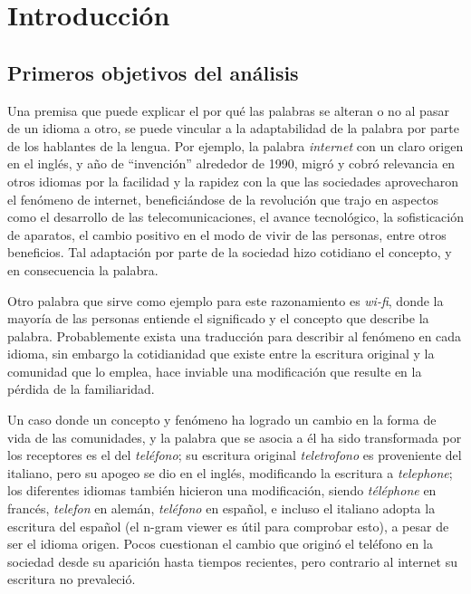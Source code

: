 

\chapter{Introducción}




\newpage

\section{Primeros objetivos del análisis}

Una premisa que puede explicar el por qué las palabras se alteran o no al pasar de un idioma a otro, se puede vincular a la adaptabilidad de la palabra por parte de los hablantes de la lengua.  Por ejemplo, la palabra \textit{internet} con un claro origen en el inglés, y año de “invención” alrededor de 1990,  migró y cobró relevancia en otros idiomas por la facilidad y la rapidez con la que las sociedades  aprovecharon el fenómeno de internet, beneficiándose de la revolución que trajo en aspectos como el desarrollo de las telecomunicaciones,  el avance tecnológico,  la sofisticación de aparatos, el cambio positivo en el modo de vivir de las personas, entre otros beneficios.  Tal adaptación por parte de la sociedad hizo cotidiano el concepto, y en consecuencia la palabra.  

Otro palabra que sirve como ejemplo para este razonamiento es \textit{wi-fi}, donde la mayoría de las personas entiende el significado y el concepto que describe la palabra. Probablemente  exista una traducción para describir al fenómeno en cada idioma, sin embargo la cotidianidad que existe entre la escritura original y la comunidad que lo emplea, hace inviable una modificación que resulte en la pérdida de la familiaridad.


Un caso donde un concepto y fenómeno ha logrado un cambio en la forma de vida de las comunidades,  y la palabra que se asocia a él ha sido transformada por los receptores es el del \textit{teléfono}; su escritura original \textit{teletrofono} es proveniente del italiano,  pero su apogeo se dio en el inglés, modificando la escritura a \textit{telephone}; los diferentes idiomas también hicieron una modificación, siendo \textit{téléphone} en francés, \textit{telefon} en alemán, \textit{teléfono} en español, e incluso el italiano adopta la escritura del español   (el n-gram viewer es útil para comprobar esto), a pesar de ser el idioma origen. Pocos cuestionan el cambio que originó el teléfono en la sociedad desde su aparición hasta  tiempos recientes, pero contrario al internet su escritura no prevaleció.  

